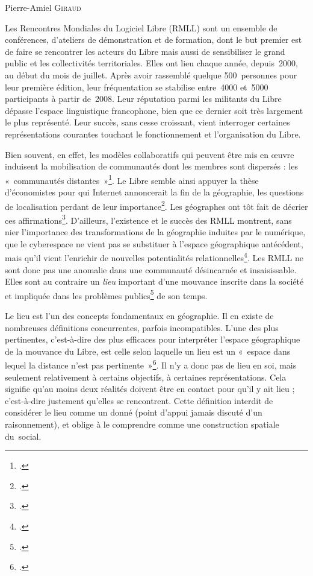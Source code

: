 \documentclass{FramateX}
\begin{document}
\begin{refsection}

\begin{flushright}
Pierre-Amiel \textsc{Giraud}
\end{flushright}
\vspace{10 mm}



Les Rencontres Mondiales du Logiciel Libre (RMLL) sont un ensemble de
conférences, d'ateliers de démonstration et de formation, dont le but
premier est de faire se rencontrer les acteurs du Libre mais aussi de
sensibiliser le grand public et les collectivités territoriales. Elles
ont lieu chaque année, depuis~2000, au début du mois de juillet. Après
avoir rassemblé quelque 500~personnes pour leur première édition, leur
fréquentation se stabilise entre~4000 et~5000 participants à partir
de~2008. Leur réputation parmi les militants du Libre dépasse l'espace
linguistique francophone, bien que ce dernier soit très largement le
plus représenté. Leur succès, sans cesse croissant, vient interroger
certaines représentations courantes touchant le fonctionnement et
l'organisation du Libre.

Bien souvent, en effet, les modèles collaboratifs qui peuvent être mis
en œuvre induisent la mobilisation de communautés dont les membres sont
dispersés : les «~communautés distantes~»\footnote{\cite{jullienhow2006}.}. Le Libre semble ainsi appuyer la thèse
d'économistes pour qui Internet annoncerait la fin de la géographie,
les questions de localisation perdant de leur importance\footnote{\cite{brien1992}.}. Les géographes ont tôt fait de décrier ces
affirmations\footnote{\cite{lassereinternet2000}.}. D'ailleurs, l'existence et le succès des RMLL montrent, sans
nier l'importance des transformations de la géographie induites par le
numérique, que le cyberespace ne vient pas se substituer à l'espace
géographique antécédent, mais qu'il vient l'enrichir de nouvelles
potentialités
relationnelles\footnote{\cite{beaudeinternet2012}.}. Les RMLL ne sont donc pas une anomalie dans une communauté
désincarnée et insaisissable. Elles sont au contraire un \textit{lieu}
important d'une mouvance inscrite dans la société et impliquée dans les
problèmes publics\footnote{\cite{sheppardprobleme2010}.} de son temps.

Le lieu est l'un des concepts fondamentaux en géographie. Il en existe
de nombreuses définitions concurrentes, parfois
incompatibles. L'une des plus pertinentes, c'est-à-dire des plus efficaces pour
interpréter l'espace géographique de la mouvance du Libre, est celle selon laquelle un lieu est un «~espace dans lequel la distance
n'est pas pertinente~»\footnote{\cite{berquelieu2003}.}. Il n'y a donc pas de lieu en soi, mais
seulement relativement à certains objectifs, à certaines
représentations. Cela signifie qu'au moins deux réalités doivent être
en contact pour qu'il y ait lieu ; c'est-à-dire justement qu'elles se
rencontrent. Cette définition interdit de considérer le lieu comme un
donné (point d'appui jamais discuté d'un raisonnement), et oblige à le
comprendre comme une construction spatiale du~social.


\end{refsection}
\end{document}
